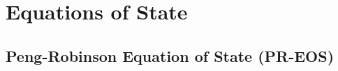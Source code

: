 
\chapter{Equations of State}\label{Chapter:EOSPR}

\section{Peng-Robinson Equation of State (PR-EOS)}\label{Chapter:EOSPR:PR}
